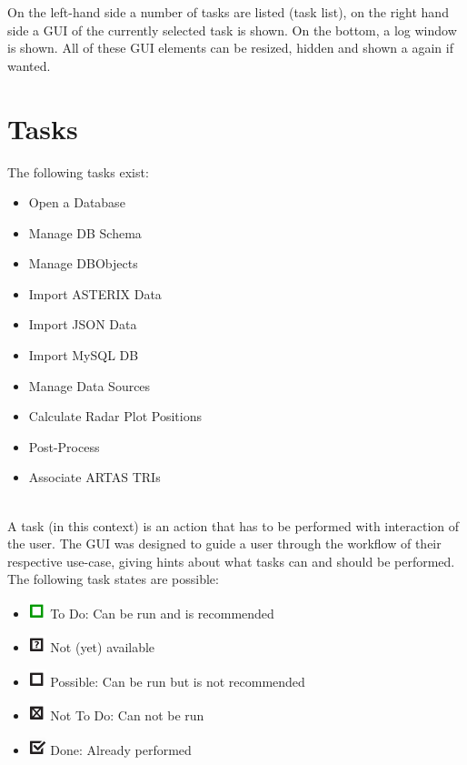 On the left-hand side a number of tasks are listed (task list), on the right hand side a GUI of the currently selected task is shown. On the bottom, a log window is shown. All of these GUI elements can be resized, hidden and shown a again if wanted. \\

\section{Tasks}

The following tasks exist:
\begin{itemize}
 \item Open a Database
 \item Manage DB Schema
 \item Manage DBObjects
 \item Import ASTERIX Data
 \item Import JSON Data
 \item Import MySQL DB
 \item Manage Data Sources
 \item Calculate Radar Plot Positions
 \item Post-Process
 \item Associate ARTAS TRIs
\end{itemize}
\  \\

A task (in this context) is an action that has to be performed with interaction of the user. The GUI was designed to guide a user through the workflow of their respective use-case, giving hints about what tasks can and should be performed. \\

The following task states are possible:

\begin{itemize}
 \item \includegraphics[width=0.5cm]{../../data/icons/todo.png} To Do: Can be run and is recommended
 \item \includegraphics[width=0.5cm]{../../data/icons/todo_maybe.png} Not (yet) available
 \item \includegraphics[width=0.5cm]{../../data/icons/not_recommended.png} Possible: Can be run but is not recommended
 \item \includegraphics[width=0.5cm]{../../data/icons/not_todo.png} Not To Do: Can not be run
 \item \includegraphics[width=0.5cm]{../../data/icons/done.png} Done: Already performed
\end{itemize}
\  \\

